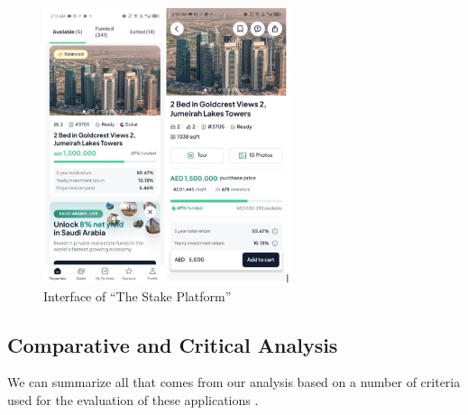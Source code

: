 \newpage
\thispagestyle{empty}
\newpage

\begin{figure}[htbp]
    \centering
    \includegraphics[width=0.65\textwidth]{images/Interface-of-the Stake Platform.png}
    \caption{Interface of ``The Stake Platform''}
    \label{fig:stake-platform}
\end{figure}

\subsection{Comparative and Critical Analysis}

We can summarize all that comes from our analysis based on a number of criteria used for the evaluation of these applications \cite{LyssnaUXAnalysis2024, StrategicManagementInsightCA2024}.

